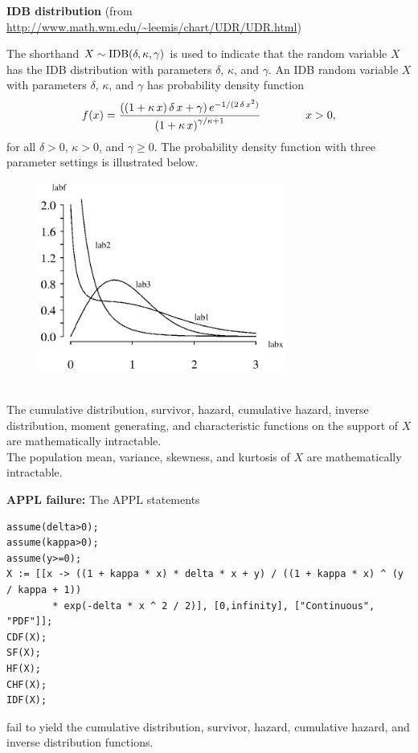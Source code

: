 \documentclass[12pt,fullpage]{article}
\begin{document}
\noindent
{\bf IDB distribution} (from \color{blue}\url{http://www.math.wm.edu/~leemis/chart/UDR/UDR.html}\color{black})

\noindent
The shorthand $X \sim {\rm IDB}(\delta, \kappa, \gamma)$ is used to indicate that the
random variable $X$ has the IDB distribution with parameters $\delta$, $\kappa$, and $\gamma$.
An IDB random variable $X$ with parameters $\delta$, $\kappa$, and $\gamma$ has probability density function 
$$
f(x) = \frac{\left(  \left( 1+{\it \kappa}\,x \right) {\it \delta}\,x+\gamma
 \right) {e^{-1/(2\,{\it \delta}\,{x}^{2})}}}{\left( 1+{\it \kappa}
\,x \right) ^{{\gamma/{\it \kappa}}+1}}\qquad \qquad x > 0,
$$
for all $\delta > 0$, $\kappa > 0$, and $\gamma \geq 0$.
The probability density function with three parameter settings is illustrated below.
{\begin{figure}[h!]
\begin{center}
\includegraphics[width=3.2in]{IDBPlot.ps}
\end{center}
\end{figure}}\\
The cumulative distribution, survivor, hazard, 
cumulative hazard, inverse distribution, moment generating, and characteristic functions on the support 
of $X$ are mathematically intractable.\\
The population mean, variance, skewness, and kurtosis of $X$ are mathematically intractable.

\vspace{0.1in}

\noindent
{\bf APPL failure:}
The APPL statements
\begin{verbatim}
assume(delta>0);
assume(kappa>0);
assume(y>=0);
X := [[x -> ((1 + kappa * x) * delta * x + y) / ((1 + kappa * x) ^ (y / kappa + 1)) 
        * exp(-delta * x ^ 2 / 2)], [0,infinity], ["Continuous", "PDF"]];
CDF(X);
SF(X);
HF(X);
CHF(X);
IDF(X);
\end{verbatim}
fail to yield the cumulative distribution, survivor, hazard, cumulative hazard, and inverse distribution functions.
\end{document}

